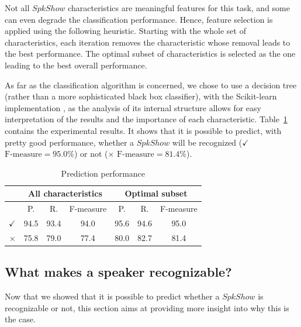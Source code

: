 Not all $SpkShow$ characteristics are meaningful features for this task, and some can even degrade the classification performance. 
Hence, feature selection is applied using the following heuristic.
Starting with the whole set of characteristics, each iteration removes the characteristic whose removal leads to the best performance.
The optimal subset of characteristics is selected as the one leading to the best overall performance.

As far as the classification algorithm is concerned, we chose to use a decision tree (rather than a more sophisticated black box classifier), with the Scikit-learn implementation \cite{scikit-learn}, as the analysis of its internal structure allows for easy interpretation of the results and the importance of each characteristic.
Table~\ref{tableresult} contains the experimental results. It shows that it is possible to predict, with pretty good performance, whether a $SpkShow$ will be recognized ($\checkmark$ $\text{F-measure} = 95.0\%$) or not ($\times$ $\text{F-measure} = 81.4\%$). 

\begin{table}[t]
\begin{center}
\begin{tabular}{|r|c|c|c|c|c|c|}
\hline
& \multicolumn{3}{c|}{All characteristics} & \multicolumn{3}{c|}{Optimal subset} \\
\hline
& P. & R. & F-measure & P. & R. & F-measure \\
\hline
$\checkmark$ & 94.5 & 93.4 & 94.0 & 95.6 & 94.6 & 95.0 \\
\hline
$\times$ & 75.8 & 79.0 & 77.4 & 80.0 & 82.7 & 81.4 \\
\hline
\end{tabular}
\caption{Prediction performance}
\label{tableresult}
\end{center}
\end{table}

\subsection{What makes a speaker recognizable?}

Now that we showed that it is possible to predict whether a $SpkShow$ is recognizable or not, this section aims at providing more insight into why this is the case.


